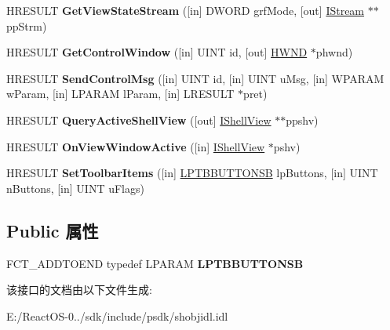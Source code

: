 \begin{DoxyCompactItemize}
\item 
\mbox{\label{interface_i_shell_browser_a1e5844dfb048a4fdd41a90683fcf01ef}} 
H\+R\+E\+S\+U\+LT {\bfseries Get\+View\+State\+Stream} (\mbox{[}in\mbox{]} D\+W\+O\+RD grf\+Mode, \mbox{[}out\mbox{]} \hyperlink{interface_i_stream}{I\+Stream} $\ast$$\ast$pp\+Strm)
\item 
\mbox{\label{interface_i_shell_browser_af5f12449238988bd698559fec2b5410e}} 
H\+R\+E\+S\+U\+LT {\bfseries Get\+Control\+Window} (\mbox{[}in\mbox{]} U\+I\+NT id, \mbox{[}out\mbox{]} \hyperlink{interfacevoid}{H\+W\+ND} $\ast$phwnd)
\item 
\mbox{\label{interface_i_shell_browser_a8ec91166187382d2dc1f5bc0645baf56}} 
H\+R\+E\+S\+U\+LT {\bfseries Send\+Control\+Msg} (\mbox{[}in\mbox{]} U\+I\+NT id, \mbox{[}in\mbox{]} U\+I\+NT u\+Msg, \mbox{[}in\mbox{]} W\+P\+A\+R\+AM w\+Param, \mbox{[}in\mbox{]} L\+P\+A\+R\+AM l\+Param, \mbox{[}in\mbox{]} L\+R\+E\+S\+U\+LT $\ast$pret)
\item 
\mbox{\label{interface_i_shell_browser_a8da7eb36457d50a1a6c48f27a6ec7d1a}} 
H\+R\+E\+S\+U\+LT {\bfseries Query\+Active\+Shell\+View} (\mbox{[}out\mbox{]} \hyperlink{interface_i_shell_view}{I\+Shell\+View} $\ast$$\ast$ppshv)
\item 
\mbox{\label{interface_i_shell_browser_a03698e3a3866988b125a9791842f1cfa}} 
H\+R\+E\+S\+U\+LT {\bfseries On\+View\+Window\+Active} (\mbox{[}in\mbox{]} \hyperlink{interface_i_shell_view}{I\+Shell\+View} $\ast$pshv)
\item 
\mbox{\label{interface_i_shell_browser_ab78f5fe944793ed17d51a75ea011916e}} 
H\+R\+E\+S\+U\+LT {\bfseries Set\+Toolbar\+Items} (\mbox{[}in\mbox{]} \hyperlink{struct___t_b_b_u_t_t_o_n}{L\+P\+T\+B\+B\+U\+T\+T\+O\+N\+SB} lp\+Buttons, \mbox{[}in\mbox{]} U\+I\+NT n\+Buttons, \mbox{[}in\mbox{]} U\+I\+NT u\+Flags)
\end{DoxyCompactItemize}
\subsection*{Public 属性}
\begin{DoxyCompactItemize}
\item 
\mbox{\label{interface_i_shell_browser_a3b52ec10dd0a7f2d94d7db0c96d46b63}} 
F\+C\+T\+\_\+\+A\+D\+D\+T\+O\+E\+ND typedef L\+P\+A\+R\+AM {\bfseries L\+P\+T\+B\+B\+U\+T\+T\+O\+N\+SB}
\end{DoxyCompactItemize}


该接口的文档由以下文件生成\+:\begin{DoxyCompactItemize}
\item 
E\+:/\+React\+O\+S-\/0../sdk/include/psdk/shobjidl.\+idl\end{DoxyCompactItemize}
